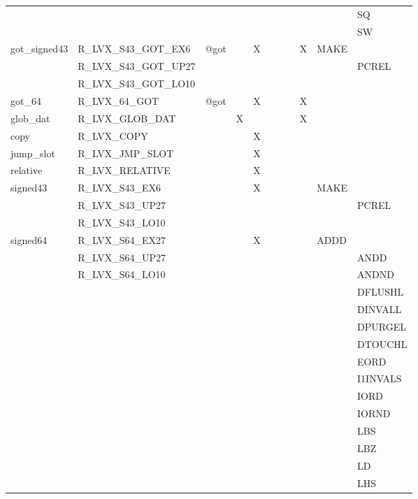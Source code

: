 {\begin{tabular}{|l|l|l|l|l|l|l|l|l|l|l|}
 & & & & & & & & & & \textsf{SQ} \\
 & & & & & & & & & & \textsf{SW} \\
\hline
\textsf{got\_signed43} & \textsf{R\_LVX\_S43\_GOT\_EX6} & \textsf{@got} & \textsf{} & \textsf{X} & \textsf{} & \textsf{} & \textsf{} & \textsf{X} & \textsf{MAKE} \\
 & \textsf{R\_LVX\_S43\_GOT\_UP27} & & & & & & & & & \textsf{PCREL} \\
 & \textsf{R\_LVX\_S43\_GOT\_LO10} & & & & & & & & & \\
\hline
\textsf{got\_64} & \textsf{R\_LVX\_64\_GOT} & \textsf{@got} & \textsf{} & \textsf{X} & \textsf{} & \textsf{} & \textsf{} & \textsf{X} & \textsf{} \\
\hline
\textsf{glob\_dat} & \textsf{R\_LVX\_GLOB\_DAT} & \textsf{} & \textsf{X} & \textsf{} & \textsf{} & \textsf{} & \textsf{} & \textsf{X} & \textsf{} \\
\hline
\textsf{copy} & \textsf{R\_LVX\_COPY} & \textsf{} & \textsf{} & \textsf{X} & \textsf{} & \textsf{} & \textsf{} & \textsf{} & \textsf{} \\
\hline
\textsf{jump\_slot} & \textsf{R\_LVX\_JMP\_SLOT} & \textsf{} & \textsf{} & \textsf{X} & \textsf{} & \textsf{} & \textsf{} & \textsf{} & \textsf{} \\
\hline
\textsf{relative} & \textsf{R\_LVX\_RELATIVE} & \textsf{} & \textsf{} & \textsf{X} & \textsf{} & \textsf{} & \textsf{} & \textsf{} & \textsf{} \\
\hline
\textsf{signed43} & \textsf{R\_LVX\_S43\_EX6} & \textsf{} & \textsf{} & \textsf{X} & \textsf{} & \textsf{} & \textsf{} & \textsf{} & \textsf{MAKE} \\
 & \textsf{R\_LVX\_S43\_UP27} & & & & & & & & & \textsf{PCREL} \\
 & \textsf{R\_LVX\_S43\_LO10} & & & & & & & & & \\
\hline
\textsf{signed64} & \textsf{R\_LVX\_S64\_EX27} & \textsf{} & \textsf{} & \textsf{X} & \textsf{} & \textsf{} & \textsf{} & \textsf{} & \textsf{ADDD} \\
 & \textsf{R\_LVX\_S64\_UP27} & & & & & & & & & \textsf{ANDD} \\
 & \textsf{R\_LVX\_S64\_LO10} & & & & & & & & & \textsf{ANDND} \\
 & & & & & & & & & & \textsf{DFLUSHL} \\
 & & & & & & & & & & \textsf{DINVALL} \\
 & & & & & & & & & & \textsf{DPURGEL} \\
 & & & & & & & & & & \textsf{DTOUCHL} \\
 & & & & & & & & & & \textsf{EORD} \\
 & & & & & & & & & & \textsf{I1INVALS} \\
 & & & & & & & & & & \textsf{IORD} \\
 & & & & & & & & & & \textsf{IORND} \\
 & & & & & & & & & & \textsf{LBS} \\
 & & & & & & & & & & \textsf{LBZ} \\
 & & & & & & & & & & \textsf{LD} \\
 & & & & & & & & & & \textsf{LHS} \\
\hline\end{tabular}
}

